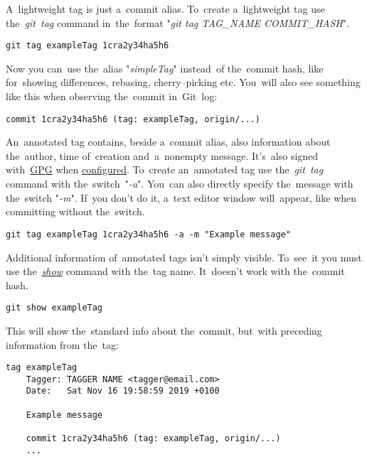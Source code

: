 A~lightweight tag is just a~commit alias. To~create a~lightweight tag use the~\textit{git~tag} command in~the~format "\textit{git tag TAG\_NAME COMMIT\_HASH}".

\example
\begin{lstlisting}[frame=no]
    git tag exampleTag 1cra2y34ha5h6
\end{lstlisting}

\noindent Now you can~use the~alias "\textit{simpleTag}" instead~of the~commit hash, like for~showing differences, rebasing, cherry--picking etc. You~will also see something like this when observing the~commit in~Git~log:
\begin{lstlisting}[frame=no]
    commit 1cra2y34ha5h6 (tag: exampleTag, origin/...)
\end{lstlisting}

\noindent An~annotated tag contains, beside a~commit alias, also information about the~author, time of~creation and~a~nonempty message. It's~also signed with~\hyperref[gpg]{GPG} when \hyperref[gitbasicconfiguration]{configured}. To~create an~annotated tag use the~\textit{git~tag} command with the~switch~"\textit{-a}". You~can also directly specify the~message with the~switch "\textit{-m}". If~you don't do it, a~text editor window will~appear, like when committing without the~switch.

\example
\begin{lstlisting}[frame=no]
    git tag exampleTag 1cra2y34ha5h6 -a -m "Example message"
\end{lstlisting}

\noindent Additional information of~annotated tags isn't simply visible. To~see~it you must use the~\hyperref[gitshow]{\textit{show}} command with the~tag name. It~doesn't work with the~commit hash.

\example
\begin{lstlisting}[frame=no]
    git show exampleTag
\end{lstlisting}

\noindent This will show the~standard info about the~commit, but~with preceding information from the~tag:
\begin{lstlisting}[frame=no]
    tag exampleTag
    Tagger: TAGGER NAME <tagger@email.com>
    Date:   Sat Nov 16 19:58:59 2019 +0100

    Example message

    commit 1cra2y34ha5h6 (tag: exampleTag, origin/...)
    ...
\end{lstlisting}

